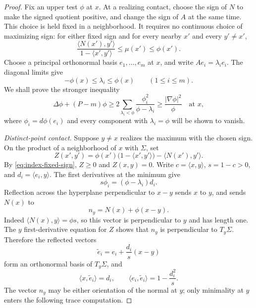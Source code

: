 \begin{proof}
Fix an upper test $\phi$ at $x$.  At a realizing contact, choose the sign
of $N$ to make the signed quotient positive, and change the sign of $A$
at the same time.  This choice is held fixed in a neighborhood.  It
requires no continuous choice of maximizing sign: for either fixed sign
and for every nearby $x'$ and every $y'\ne x'$,
\begin{equation}\label{eq:index-fixed-sign}
 \frac{\langle N(x'),y'\rangle}{1-\langle x',y'\rangle}
 \le\mu(x')\le\phi(x').
\end{equation}
Choose a principal orthonormal basis $e_1,\ldots,e_m$ at $x$, and write
$Ae_i=\lambda_i e_i$.  The diagonal limits give
\begin{equation}\label{eq:index-two-sided-eigenvalues}
 -\phi(x)\le\lambda_i\le\phi(x)\qquad(1\le i\le m).
\end{equation}
We shall prove the stronger inequality
\begin{equation}\label{eq:index-gradient-test}
 \Delta\phi+(P-m)\phi
 \ge 2\sum_{\lambda_i<\phi}
             \frac{\phi_i^2}{\phi-\lambda_i}
 \ge\frac{|\nabla\phi|^2}{\phi}
 \quad\text{at }x,
\end{equation}
where $\phi_i=d\phi(e_i)$ and every component with $\lambda_i=\phi$
will be shown to vanish.

\smallskip
\noindent\emph{Distinct-point contact.}
Suppose $y\ne x$ realizes the maximum with the chosen sign.  On the
product of a neighborhood of $x$ with $\Sigma$, set
\[
 Z(x',y')=\phi(x')\bigl(1-\langle x',y'\rangle\bigr)
                  -\langle N(x'),y'\rangle.
\]
By \eqref{eq:index-fixed-sign}, $Z\ge0$ and $Z(x,y)=0$.  Write
$c=\langle x,y\rangle$, $s=1-c>0$, and $d_i=\langle e_i,y\rangle$.
The first derivatives at the minimum give
\begin{equation}\label{eq:index-distinct-first}
 s\phi_i=(\phi-\lambda_i)d_i.
\end{equation}
Reflection across the hyperplane perpendicular to $x-y$ sends $x$ to
$y$, and sends $N(x)$ to
\[
 n_y=N(x)+\phi(x-y).
\]
Indeed $\langle N(x),y\rangle=\phi s$, so this vector is perpendicular to
$y$ and has length one.  The $y$ first-derivative equation for $Z$ shows
that $n_y$ is perpendicular to $T_y\Sigma$.  Therefore the reflected
vectors
\[
 \widetilde e_i=e_i+\frac{d_i}{s}(x-y)
\]
form an orthonormal basis of $T_y\Sigma$, and
\[
 \langle x,\widetilde e_i\rangle=d_i,
 \qquad
 \langle e_i,\widetilde e_i\rangle=1-\frac{d_i^2}{s}.
\]
The vector $n_y$ may be either orientation of the normal at $y$; only
minimality at $y$ enters the following trace computation.


\end{proof}
